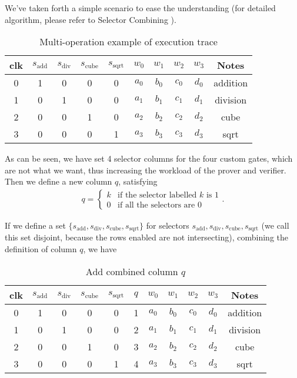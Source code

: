 We've taken forth a simple scenario to ease the understanding (for detailed algorithm, please refer to Selector Combining \cite{website:selector-combining}).

\begin{table}[!ht]
\centering
\begin{tabular}{|c|c|c|c|c|c|c|c|c|c|}
  \hline
  clk & $s_\text{add}$ & $s_\text{div}$ & $s_\text{cube}$ & $s_\text{sqrt}$ & $w_0$ & $w_1$ & $w_2$ & $w_3$ & Notes \\
  \hline
  0 & 1 & 0 & 0 & 0 & $a_0$ & $b_0$ & $c_0$ & $d_0$ & addition \\
  1 & 0 & 1 & 0 & 0 & $a_1$ & $b_1$ & $c_1$ & $d_1$ & division \\
  2 & 0 & 0 & 1 & 0 & $a_2$ & $b_2$ & $c_2$ & $d_2$ & cube \\
  3 & 0 & 0 & 0 & 1 & $a_3$ & $b_3$ & $c_3$ & $d_3$ & sqrt \\
  \hline
\end{tabular}
\caption{Multi-operation example of execution trace}
\end{table}

As can be seen, we have set 4 selector columns for the four custom gates, which are not what we want, thus increasing the workload of the prover and verifier. Then we define a new column $q$, satisfying
\begin{align*}
q = \begin{cases}
   k & \text{if the selector labelled } k \text{ is } 1 \\
   0 & \text{if all the selectors are } 0
\end{cases}.
\end{align*}

If we define a set $\{s_\text{add},s_\text{div},s_\text{cube},s_\text{sqrt}\}$ for selectors $s_\text{add},s_\text{div},s_\text{cube},s_\text{sqrt}$ (we call this set disjoint, because the rows enabled are not intersecting), combining the definition of column $q$, we have
\begin{table}[!ht]
\centering
\begin{tabular}{|c|c|c|c|c|c|c|c|c|c|c|}
  \hline
  clk & $s_\text{add}$ & $s_\text{div}$ & $s_\text{cube}$ & $s_\text{sqrt}$ & $q$ & $w_0$ & $w_1$ & $w_2$ & $w_3$ & Notes \\
  \hline
  0 & 1 & 0 & 0 & 0 & 1 & $a_0$ & $b_0$ & $c_0$ & $d_0$ & addition \\
  1 & 0 & 1 & 0 & 0 & 2 & $a_1$ & $b_1$ & $c_1$ & $d_1$ & division \\
  2 & 0 & 0 & 1 & 0 & 3 & $a_2$ & $b_2$ & $c_2$ & $d_2$ & cube \\
  3 & 0 & 0 & 0 & 1 & 4 & $a_3$ & $b_3$ & $c_3$ & $d_3$ & sqrt \\
  \hline
\end{tabular}
\caption{Add combined column $q$}
\end{table}

